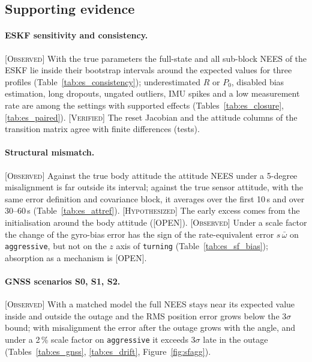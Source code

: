 \documentclass[11pt,a4paper]{article}
\newcommand{\obs}{\textsc{[Observed]}}
\newcommand{\hyp}{\textsc{[Hypothesized]}}
\newcommand{\ver}{\textsc{[Verified]}}
\newcommand{\openlbl}{\textsc{[OPEN]}}
\begin{document}
\subsection{Supporting evidence}\label{sec:support}

\paragraph{ESKF sensitivity and consistency.} \obs{} With the true parameters the full-state and all
sub-block NEES of the ESKF lie inside their bootstrap intervals around the expected values for three
profiles (Table~\ref{tab:es_consistency}); underestimated $R$ or $P_0$, disabled bias estimation,
long dropouts, ungated outliers, IMU spikes and a low measurement rate are among the settings with
supported effects (Tables~\ref{tab:es_closure}, \ref{tab:es_paired}). \ver{} The reset Jacobian and the
attitude columns of the transition matrix agree with finite differences (tests).

\paragraph{Structural mismatch.} \obs{} Against the true body attitude the attitude NEES under a
5-degree misalignment is far outside its interval; against the true sensor attitude, with the same
error definition and covariance block, it averages \AttRefSensorEarly{} over the first 10\,s and
\AttRefSensorLate{} over 30--60\,s (Table~\ref{tab:es_attref}). \hyp{} The early excess comes from the
initialisation around the body attitude (\openlbl). \obs{} Under a scale factor the change of the gyro-bias error has the
sign of the rate-equivalent error $s\,\bar\omega$ on \texttt{aggressive}, but not on the $z$ axis of
\texttt{turning} (Table~\ref{tab:es_sf_bias}); absorption as a mechanism is \openlbl.

\paragraph{GNSS scenarios S0, S1, S2.} \obs{} With a matched model the full NEES stays near its
expected value inside and outside the outage and the RMS position error grows below the $3\sigma$
bound; with misalignment the error after the outage grows with the angle, and under a 2\,\% scale
factor on \texttt{aggressive} it exceeds $3\sigma$ late in the outage (Tables~\ref{tab:es_gnss},
\ref{tab:es_drift}, Figure~\ref{fig:sfagg}).
\end{document}

